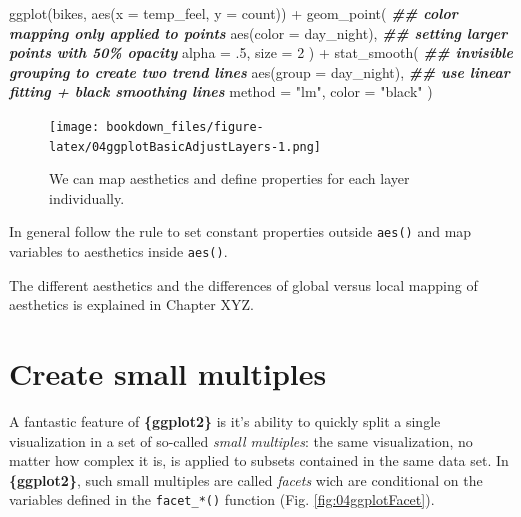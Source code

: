 \documentclass[
]{krantz}
\makeatletter
\newenvironment{Shaded}{\begin{snugshade}}{\end{snugshade}}
\newcommand{\AttributeTok}[1]{\textcolor[rgb]{0.61,0.61,0.61}{#1}}
\newcommand{\DecValTok}[1]{\textcolor[rgb]{0.06,0.06,0.06}{#1}}
\newcommand{\DocumentationTok}[1]{\textcolor[rgb]{0.37,0.37,0.37}{\textbf{\textit{#1}}}}
\newcommand{\FunctionTok}[1]{\textcolor[rgb]{0,0,0}{#1}}
\newcommand{\NormalTok}[1]{#1}
\newcommand{\SpecialCharTok}[1]{\textcolor[rgb]{0,0,0}{#1}}
\newcommand{\StringTok}[1]{\textcolor[rgb]{0.5,0.5,0.5}{#1}}
\newenvironment{kframe}{%
\medskip{}
\setlength{\fboxsep}{.8em}
 \def\at@end@of@kframe{}%
 \ifinner\ifhmode%
  \def\at@end@of@kframe{\end{minipage}}%
  \begin{minipage}{\columnwidth}%
 \fi\fi%
 \def\FrameCommand##1{\hskip\@totalleftmargin \hskip-\fboxsep
 \colorbox{shadecolor}{##1}\hskip-\fboxsep
     \hskip-\linewidth \hskip-\@totalleftmargin \hskip\columnwidth}%
 \MakeFramed {\advance\hsize-\width
   \@totalleftmargin\z@ \linewidth\hsize
   \@setminipage}}%
 {\par\unskip\endMakeFramed%
 \at@end@of@kframe}
\renewenvironment{Shaded}{\begin{kframe}}{\end{kframe}}
\makeatother
\begin{document}
\begin{Shaded}
\begin{Highlighting}[]
\FunctionTok{ggplot}\NormalTok{(bikes, }\FunctionTok{aes}\NormalTok{(}\AttributeTok{x =}\NormalTok{ temp\_feel, }\AttributeTok{y =}\NormalTok{ count)) }\SpecialCharTok{+} 
  \FunctionTok{geom\_point}\NormalTok{(}
    \DocumentationTok{\#\# color mapping only applied to points}
    \FunctionTok{aes}\NormalTok{(}\AttributeTok{color =}\NormalTok{ day\_night), }
    \DocumentationTok{\#\# setting larger points with 50\% opacity}
    \AttributeTok{alpha =}\NormalTok{ .}\DecValTok{5}\NormalTok{, }\AttributeTok{size =} \DecValTok{2}
\NormalTok{  ) }\SpecialCharTok{+} 
  \FunctionTok{stat\_smooth}\NormalTok{(}
    \DocumentationTok{\#\# invisible grouping to create two trend lines}
    \FunctionTok{aes}\NormalTok{(}\AttributeTok{group =}\NormalTok{ day\_night), }
    \DocumentationTok{\#\# use linear fitting + black smoothing lines}
    \AttributeTok{method =} \StringTok{"lm"}\NormalTok{, }\AttributeTok{color =} \StringTok{"black"}
\NormalTok{  )}
\end{Highlighting}
\end{Shaded}

\begin{figure}
\centering
\texttt{[image: bookdown\_files/figure-latex/04ggplotBasicAdjustLayers-1.png]}
\caption{\label{fig:04ggplotBasicAdjustLayers}We can map aesthetics and define properties for each layer individually.}
\end{figure}

In general follow the rule to set constant properties outside \texttt{aes()} and map variables to aesthetics inside \texttt{aes()}.

The different aesthetics and the differences of global versus local mapping of aesthetics is explained in Chapter XYZ.

\hypertarget{faceting}{%
\section{Create small multiples}\label{faceting}}

A fantastic feature of \textbf{\{ggplot2\}} is it's ability to quickly split a single visualization in a set of so-called \emph{small multiples}: the same visualization, no matter how complex it is, is applied to subsets contained in the same data set. In \textbf{\{ggplot2\}}, such small multiples are called \emph{facets} wich are conditional on the variables defined in the \texttt{facet\_*()} function (Fig. \ref{fig:04ggplotFacet}).
\end{document}

